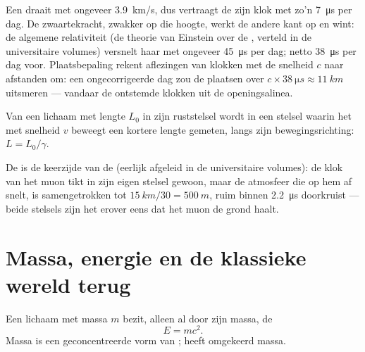 \begin{remark}\label{rem:g12:special-relativity:gps}
Een  draait met ongeveer \qty{3.9}{km/s}, dus vertraagt de
 zijn klok met zo'n \qty{7}{\micro s} per dag. De
zwaartekracht, zwakker op die hoogte, werkt de andere kant op en wint: de
algemene relativiteit (de theorie van Einstein over de , verteld in
de universitaire volumes) versnelt haar met ongeveer \qty{45}{\micro s} per
dag; netto \qty{38}{\micro s} per dag voor. Plaatsbepaling rekent aflezingen
van klokken met de snelheid $c$ naar afstanden om: een ongecorrigeerde dag zou
de plaatsen over $c \times \qty{38}{\micro s} \approx \qty{11}{km}$
uitsmeren --- vandaar de ontstemde klokken uit de openingsalinea.
\end{remark}

\begin{proposition}[Lengtecontractie]\label{prop:g12:special-relativity:contraction}
Van een lichaam met lengte $L_0$ in zijn ruststelsel wordt in een stelsel
waarin het met snelheid $v$ beweegt een kortere lengte gemeten, langs zijn
bewegingsrichting: $L = L_0/\gamma$.
\end{proposition}
\admitted

\begin{remark}\label{rem:g12:special-relativity:muonframe}
De  is de keerzijde van de  (eerlijk afgeleid in
de universitaire volumes): de klok van het muon tikt in zijn eigen stelsel
gewoon, maar de atmosfeer die op hem af snelt, is samengetrokken tot
$\qty{15}{km}/30 = \qty{500}{m}$, ruim binnen \qty{2.2}{\micro s} doorkruist
--- beide stelsels zijn het erover eens dat het muon de grond haalt.
\end{remark}

\section{Massa, energie en de klassieke wereld terug}

\begin{theorem}\label{thm:g12:special-relativity:emc2}
Een lichaam met massa $m$ bezit, alleen al door zijn massa, de 
\[ E = m c^2 . \]
Massa is een geconcentreerde vorm van ;  heeft omgekeerd massa.
\end{theorem}
\admitted

